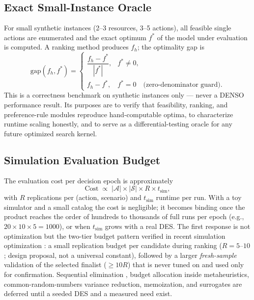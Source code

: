 \documentclass[11pt,a4paper]{article}
\newcommand{\Acal}{\mathcal{A}}
\newcommand{\Scal}{\mathcal{S}}
\begin{document}
\subsection{Exact Small-Instance Oracle}\label{sec:oracle}

For small synthetic instances (2--3 resources, 3--5 actions), all feasible
single actions are enumerated and the exact optimum $f^{*}$ of the model
under evaluation is computed. A ranking method produces $f_h$; the
optimality gap is
\begin{equation}\label{eq:gap}
\mathrm{gap}(f_h, f^{*})
=
\begin{cases}
\dfrac{f_h - f^{*}}{|f^{*}|}, & f^{*} \ne 0,\\[8pt]
f_h - f^{*}, & f^{*} = 0 \quad \text{(zero-denominator guard)}.
\end{cases}
\end{equation}
This is a correctness benchmark on synthetic instances only --- never a
DENSO performance result. Its purposes are to verify that feasibility,
ranking, and preference-rule modules reproduce hand-computable optima, to
characterize runtime scaling honestly, and to serve as a differential-testing
oracle for any future optimized search kernel.

\subsection{Simulation Evaluation Budget}\label{sec:budget}

The evaluation cost per decision epoch is approximately
\begin{equation}\label{eq:evalcost}
\text{Cost} \;\propto\; |\Acal| \times |\Scal| \times R \times t_{\mathrm{sim}},
\end{equation}
with $R$ replications per (action, scenario) and $t_{\mathrm{sim}}$ runtime
per run. With a toy simulator and a small catalog the cost is negligible; it
becomes binding once the product reaches the order of hundreds to thousands
of full runs per epoch (e.g., $20 \times 10 \times 5 = 1000$), or when
$t_{\mathrm{sim}}$ grows with a real DES. The first response is not
optimization but the two-tier budget pattern verified in recent simulation
optimization \cite{ghaedyheidary2024simopt}: a small replication budget per
candidate during ranking ($R = 5$--$10$; design proposal, not a universal
constant), followed by a larger \emph{fresh-sample} validation of the
selected finalist ($\ge 10R$) that is never tuned on and used only for
confirmation. Sequential elimination \cite{wang2024sequential}, budget
allocation inside metaheuristics, common-random-numbers variance reduction,
memoization, and surrogates are deferred until a seeded DES and a measured
need exist.
\end{document}

